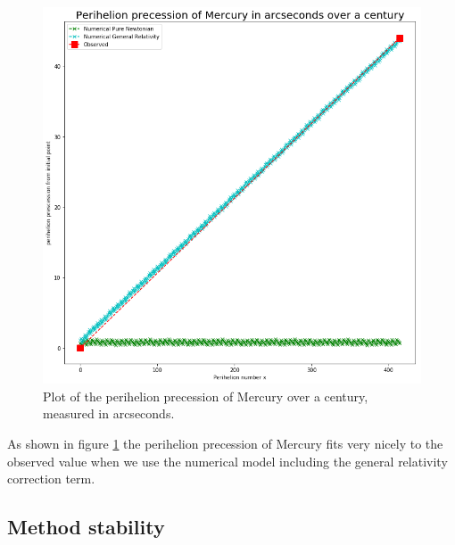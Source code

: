 \documentclass[a4paper, fontsize=11pt]{article}
\begin{document}
\begin{figure}[H]
\centering
\includegraphics[scale=0.45]{plots/PerihelionPrecessionMercury}
\caption{Plot of the perihelion precession of Mercury over a century, measured in arcseconds.}
\label{PerihelionMercury}
\end{figure}

As shown in figure \ref{PerihelionMercury} the perihelion precession of Mercury fits very nicely to the observed value when we use the numerical model including the general relativity correction term.


\subsection{Method stability} 
\end{document}

